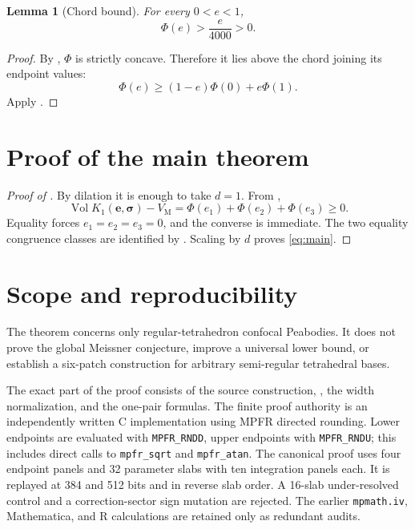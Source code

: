 \documentclass[11pt]{article}
\numberwithin{equation}{section}
\newtheorem{lemma}[theorem]{Lemma}
\theoremstyle{remark}
\newcommand{\Vol}{\operatorname{Vol}}
\newcommand{\VM}{V_{\mathrm M}}
\begin{document}
\begin{lemma}[Chord bound]
\label{lem:chord}
For every \(0<e<1\),
\begin{equation}
  \Phi(e)>\frac e{4000}>0.
  \label{eq:chord-bound}
\end{equation}
\end{lemma}

\begin{proof}
By , \(\Phi\) is strictly concave.  Therefore it lies above the chord joining its endpoint values:
\[
  \Phi(e)\ge(1-e)\Phi(0)+e\Phi(1).
\]
Apply .
\end{proof}

\section{Proof of the main theorem}

\begin{proof}[Proof of ]
By dilation it is enough to take \(d=1\).  From ,
\[
  \Vol K_1(\mathbf e,\boldsymbol\sigma)-\VM
  =\Phi(e_1)+\Phi(e_2)+\Phi(e_3)\ge0.
\]
Equality forces \(e_1=e_2=e_3=0\), and the converse is immediate.  The two equality congruence classes are identified by .  Scaling by \(d\) proves \eqref{eq:main}.
\end{proof}

\section{Scope and reproducibility}

The theorem concerns only regular-tetrahedron confocal Peabodies.  It does not prove the global Meissner conjecture, improve a universal lower bound, or establish a six-patch construction for arbitrary semi-regular tetrahedral bases.

The exact part of the proof consists of the source construction, , the width normalization, and the one-pair formulas.  The finite proof authority is an independently written C implementation using MPFR directed rounding.  Lower endpoints are evaluated with \texttt{MPFR\_RNDD}, upper endpoints with \texttt{MPFR\_RNDU}; this includes direct calls to \texttt{mpfr\_sqrt} and \texttt{mpfr\_atan}.  The canonical proof uses four endpoint panels and 32 parameter slabs with ten integration panels each.  It is replayed at 384 and 512 bits and in reverse slab order.  A 16-slab under-resolved control and a correction-sector sign mutation are rejected.  The earlier \texttt{mpmath.iv}, Mathematica, and R calculations are retained only as redundant audits.
\end{document}
